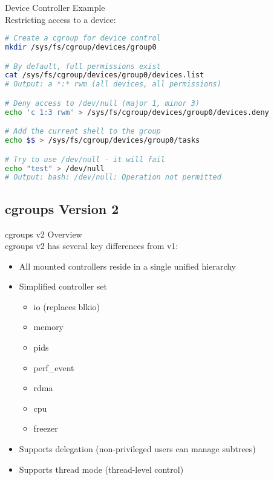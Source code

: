 \begin{example2}{Device Controller Example}\\
    Restricting access to a device:
    
\begin{lstlisting}[language=bash, style=basesmol]
# Create a cgroup for device control
mkdir /sys/fs/cgroup/devices/group0

# By default, full permissions exist
cat /sys/fs/cgroup/devices/group0/devices.list
# Output: a *:* rwm (all devices, all permissions)

# Deny access to /dev/null (major 1, minor 3)
echo 'c 1:3 rwm' > /sys/fs/cgroup/devices/group0/devices.deny

# Add the current shell to the group
echo $$ > /sys/fs/cgroup/devices/group0/tasks

# Try to use /dev/null - it will fail
echo "test" > /dev/null
# Output: bash: /dev/null: Operation not permitted
\end{lstlisting}
\end{example2}

\subsection{cgroups Version 2}

\begin{definition}{cgroups v2 Overview}\\
    cgroups v2 has several key differences from v1:
    \begin{itemize}
        \item All mounted controllers reside in a single unified hierarchy
        \item Simplified controller set
            \begin{itemize}
                \item io (replaces blkio)
                \item memory
                \item pids
                \item perf\_event
                \item rdma
                \item cpu
                \item freezer
            \end{itemize}
        \item Supports delegation (non-privileged users can manage subtrees)
        \item Supports thread mode (thread-level control)
    \end{itemize}
\end{definition}

